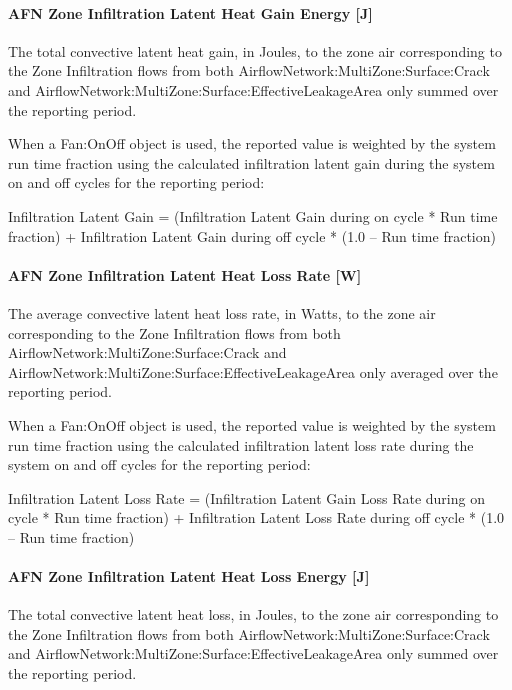 \paragraph{AFN Zone Infiltration Latent Heat Gain Energy {[}J{]}}\label{afn-zone-infiltration-latent-heat-gain-energy-j}

The total convective latent heat gain, in Joules, to the zone air corresponding to the Zone Infiltration flows from both AirflowNetwork:MultiZone:Surface:Crack and AirflowNetwork:MultiZone:Surface:EffectiveLeakageArea only  summed over the reporting period.

When a Fan:OnOff object is used, the reported value is weighted by the system run time fraction using the calculated infiltration latent gain during the system on and off cycles for the reporting period:

Infiltration Latent Gain = (Infiltration Latent Gain during on cycle * Run time fraction) + Infiltration Latent Gain during off cycle * (1.0 -- Run time fraction)

\paragraph{AFN Zone Infiltration Latent Heat Loss Rate {[}W{]}}\label{afn-zone-infiltration-latent-heat-loss-rate-w}

The average convective latent heat loss rate, in Watts, to the zone air corresponding to the Zone Infiltration flows from both AirflowNetwork:MultiZone:Surface:Crack and AirflowNetwork:MultiZone:Surface:EffectiveLeakageArea only  averaged over the reporting period.

When a Fan:OnOff object is used, the reported value is weighted by the system run time fraction using the calculated infiltration latent loss rate during the system on and off cycles for the reporting period:

Infiltration Latent Loss Rate = (Infiltration Latent Gain Loss Rate during on cycle * Run time fraction) + Infiltration Latent Loss Rate during off cycle * (1.0 -- Run time fraction)

\paragraph{AFN Zone Infiltration Latent Heat Loss Energy {[}J{]}}\label{afn-zone-infiltration-latent-heat-loss-energy-j}

The total convective latent heat loss, in Joules, to the zone air corresponding to the Zone Infiltration flows from both AirflowNetwork:MultiZone:Surface:Crack and AirflowNetwork:MultiZone:Surface:EffectiveLeakageArea only  summed over the reporting period.

